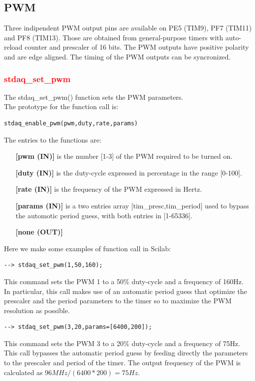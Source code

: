 \documentclass[letterpaper,10pt,english]{hitec}
\begin{document}
\subsection{PWM}

Three indipendent PWM output pins are available on PE5 (TIM9), PF7 (TIM11) and PF8 (TIM13).
Those are obtained from general-purpose timers with auto-reload counter and prescaler of 16 bits. The PWM outputs have positive polarity and are edge aligned.
The timing of the PWM outputs can be syncronized.

\subsubsection{\textcolor{red}{stdaq\_set\_pwm}}

The stdaq\_set\_pwm() function sets the PWM parameters. \\
The prototype for the function call is:
\begin{verbatim}
stdaq_enable_pwm(pwm,duty,rate,params)
\end{verbatim}
The entries to the functions are:
\begin{itemize}
\item [\textbf{[pwm (IN)]}] is the number [1-3] of the PWM required to be turned on. 
\item [\textbf{[duty (IN)]}] is the duty-cycle expressed in percentage in the range [0-100]. 
\item [\textbf{[rate (IN)]}] is the frequency of the PWM expressed in Hertz. 
\item [\textbf{[params (IN)]}] is a two entries array [tim\_presc,tim\_period] used to bypass the automotic period guess, with both entries in [1-65336].
\item [\textbf{[none (OUT)]}]
\end{itemize}
Here we make some examples of function call in Scilab:
\begin{verbatim}
--> stdaq_set_pwm(1,50,160);
\end{verbatim}
This command sets the PWM 1 to a 50\% duty-cycle and a frequency of 160Hz. In particular, this call makes use of an automatic period guess that optimize the prescaler and the period parameters to the timer so to maximize the PWM resolution as possible.

\begin{verbatim}
--> stdaq_set_pwm(3,20,params=[6400,200]);
\end{verbatim}
This command sets the PWM 3 to a 20\% duty-cycle and a frequency of 75Hz. This call bypasses the automatic period guess by feeding directly the parameters to the prescaler and period of the timer. The output frequency of the PWM is calculated as $96 MHz/(6400*200) = 75 Hz$.
\end{document}
